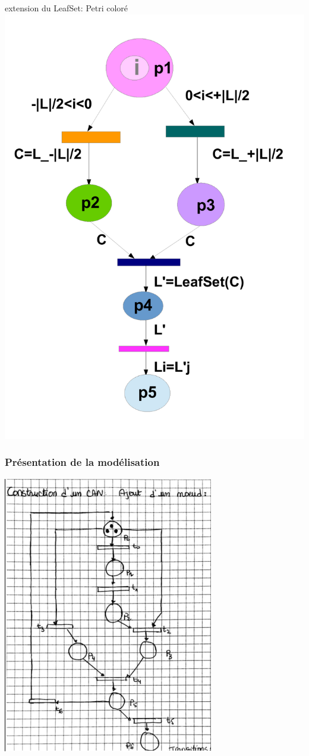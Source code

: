 \documentclass[french]{beamer}
\begin{document}
\begin{frame}{extension du LeafSet: Petri coloré}
\includegraphics[width=0.58\linewidth]{"petri_colore_leafset"} 
\end{frame}
\begin{frame}
  \frametitle{Présentation de la modélisation}
  \begin{center}
  \includegraphics[scale=0.45]{PR2.png}
  \end{center}
\end{frame}
  
\end{document}

